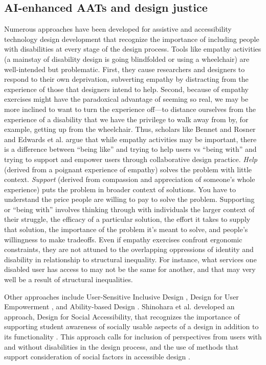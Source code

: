 \documentclass[11pt,dvipdfm]{article}
\begin{document}
\subsection{AI-enhanced AATs and design justice}
Numerous approaches have been developed for assistive and accessibility technology design development that recognize the importance of including people with disabilities at every stage of the design process. Tools like empathy activities (a mainstay of disability design is going blindfolded or using a wheelchair) are well-intended but problematic. First, they cause researchers and designers to respond to their own deprivation, subverting empathy by distracting from the experience of those that designers intend to help. Second, because of empathy exercises might have the paradoxical advantage of seeming so real, we may be more inclined to want to turn the experience off—to distance ourselves from the experience of a disability that we have the privilege to walk away from by, for example, getting up from the wheelchair. Thus, scholars like Bennet and Rosner \cite{5} and Edwards et al. \cite{17} argue that while empathy activities may be important, there is a difference between “being like” and trying to help users vs “being with” and trying to support and empower users through collaborative design practice. \emph{Help} (derived from a poignant experience of empathy) solves the problem with little context. \emph{Support} (derived from compassion and appreciation of someone’s whole experience) puts the problem in broader context of solutions. You have to understand the price people are willing to pay to solve the problem. Supporting or “being with” involves thinking through with individuals the larger context of their struggle, the efficacy of a particular solution, the effort it takes to supply that solution, the importance of the problem it’s meant to solve, and people’s willingness to make tradeoffs. Even if empathy exercises confront ergonomic constraints, they are not attuned to the overlapping oppressions of identity and disability in relationship to structural inequality. For instance, what services one disabled user has access to may not be the same for another, and that may very well be a result of structural inequalities.

Other approaches include User-Sensitive Inclusive Design \cite{42}, Design for User Empowerment \cite{31}, and Ability-based Design \cite{55}. Shinohara et al. developed an approach, Design for Social Accessibility, that recognizes the importance of supporting student awareness of socially usable aspects of a design in addition to its functionality \cite{49}. This approach calls for inclusion of perspectives from users with and without disabilities in the design process, and the use of methods that support consideration of social factors in accessible design \cite{49}.  
\end{document}

